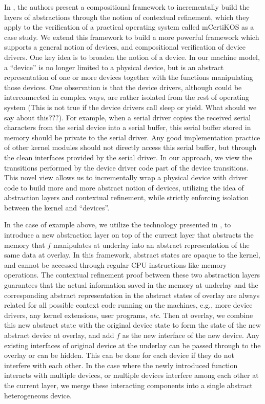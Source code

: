 {In \cite{dscal15}, the authors present a compositional framework to
incrementally build the layers of abstractions
through the notion of contextual refinement, which they apply to
the verification of a practical operating system called mCertiKOS
as a case study.
We extend this framework to build a more powerful framework which
supports a general notion of devices, and compositional verification
of device drivers. One key idea is to broaden the notion of a device.
In our machine model, a ``device'' is no longer limited to a
physical device, but is an abstract representation of one or more
devices together with the functions manipulating those devices.
One observation is that the device drivers,
although could be interconnected in complex ways, are rather isolated from
the rest of operating system (This is not true if the device drivers call sleep or
yield. What should we say about this???). For example, when a serial driver copies
the received serial characters from the serial device into a serial buffer, this
serial buffer stored in memory should be private to the serial driver.
Any good implementation practice of other kernel modules should not directly
access this serial buffer, but through the clean interfaces
provided by the serial driver. In our approach, we view the transitions performed
by the device driver code part of the device transitions. This novel view allows
us to incrementally wrap a physical device with driver code
to build more and more abstract notion of devices, utilizing the idea of
abstraction layers and contextual refinement, while strictly enforcing
isolation between the kernel and ``devices''.

In the case of example above, we utilize the technology presented in \cite{dscal15}, 
to introduce a new abstraction layer on top of the current layer that abstracts
the memory that $f$ manipulates at underlay into an abstract representation
of the same data at overlay. In this framework, abstract states are opaque
to the kernel, and cannot be accessed through regular CPU instructions like
memory operations. The contextual refinement proof between these two abstraction
layers guarantees that the actual information saved in the memory at underlay
and the corresponding abstract representation in the abstract states of overlay
are always related for all possible context code running on the machines,
e.g., more device drivers, any kernel extensions, user programs, {\it etc}.
Then at overlay, we combine this new abstract state with the original device state
to form the state of the new abstract device at overlay, and add $f$ as the
new interface of the new device. Any existing interfaces of original device
at the underlay can be
passed through to the overlay or can be hidden. This can be done for each
device if they do not interfere with each other.
In the case where the newly introduced function interacts with multiple devices,
or multiple devices interfere among each other at the current layer, we merge
these interacting components into a single abstract heterogeneous device.

}
